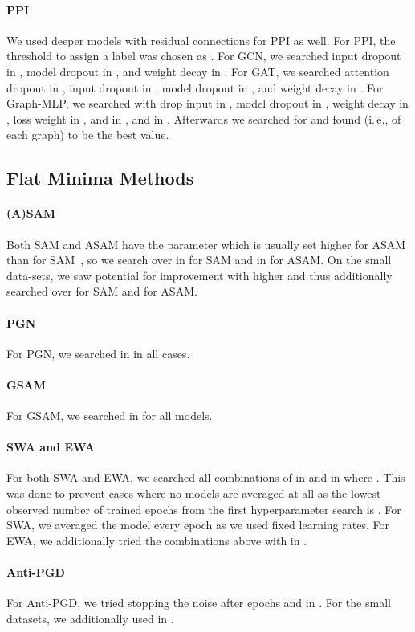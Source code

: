 \documentclass[runningheads]{llncs}
\newcommand{\ie}{i.\,e.,\xspace}
\newcommand{\GraphMLP}{Graph-MLP\xspace}
\begin{document}
\paragraph{PPI}
We used deeper models with residual connections for PPI as well. 
For PPI, the threshold to assign a label was chosen as .
For GCN, we searched input dropout in , model dropout in , and weight decay in .
For GAT, we searched attention dropout in , input dropout in , model dropout in , and weight decay in .
For \GraphMLP, we searched with drop input in , model dropout in , weight decay in , loss weight in , and  in , and  in .
Afterwards we searched for  and found  (\ie  of each graph) to be the best value.


\subsection{Flat Minima Methods}

\paragraph{(A)SAM}
Both SAM and ASAM have the parameter  which is usually set higher for ASAM than for SAM~\cite{Kwon21asam}, so we search over  in  for SAM and  in  for ASAM.
On the small data-sets, we saw potential for improvement with higher  and thus additionally searched over  for SAM and  for ASAM.

\paragraph{PGN}
For PGN, we searched  in  in all cases.

\paragraph{GSAM}
For GSAM, we searched  in  for all models.

\paragraph{SWA and EWA}
For both SWA and EWA, we searched all combinations of  in  and  in  where   .
This was done to prevent cases where no models are averaged at all as the lowest observed number of trained epochs from the first hyperparameter search is .
For SWA, we averaged the model every epoch as we used fixed learning rates.
For EWA, we additionally tried the combinations above with  in .

\paragraph{Anti-PGD}
For Anti-PGD, we tried stopping the noise after  epochs and  in .
For the small datasets, we additionally used  in .
\end{document}

